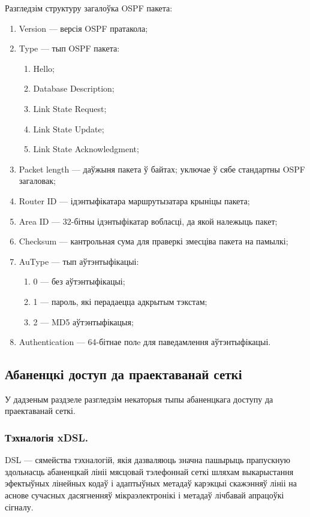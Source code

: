 Разгледзім структуру загалоўка OSPF пакета:
\begin{enumerate}
    \item Version --- версія OSPF пратакола;
    \item Type --- тып OSPF пакета:
    \begin{enumerate}
        \item Hello;
        \item Database Description;
        \item Link State Request;
        \item Link State Update;
        \item Link State Acknowledgment;
    \end{enumerate}
    \item Packet length --- даўжыня пакета ў байтах;
          уключае ў сябе стандартны OSPF загаловак;
    \item Router ID --- ідэнтыфікатара маршрутызатара крыніцы пакета;
    \item Area ID --- 32-бітны ідэнтыфікатар вобласці, да якой належыць пакет;
    \item Checksum --- кантрольная сума для праверкі змесціва пакета на памылкі;
    \item AuType --- тып аўтэнтыфікацыі:
    \begin{enumerate}
        \item 0 --- без аўтэнтыфікацыі;
        \item 1 --- пароль, які перадаецца адкрытым тэкстам;
        \item 2 --- MD5 аўтэнтыфікацыя;
    \end{enumerate}
    \item Authentication --- 64-бітнае полe для паведамлення аўтэнтыфікацыі.
\end{enumerate}



\subsection{Абаненцкі доступ да праектаванай сеткі}

У дадзеным раздзеле разгледзім некаторыя тыпы абаненцкага доступу
да праектаванай сеткі.

\subsubsection{Тэхналогія xDSL.}

DSL --- сямейства тэхналогій, якія дазваляюць значна пашырыць прапускную здольнасць абаненцкай лініі мясцовай тэлефоннай сеткі шляхам выкарыстання эфектыўных лінейных кодаў і адаптыўных метадаў карэкцыі скажэнняў лініі на аснове сучасных дасягненняў мікраэлектронікі і метадаў лічбавай апрацоўкі сігналу.


